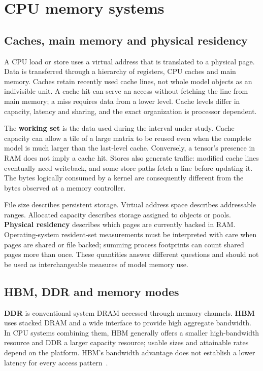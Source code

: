 \section{CPU memory systems}
\label{sec:cpu-memory-systems}

\subsection{Caches, main memory and physical residency}

A CPU load or store uses a virtual address that is translated to a
physical page.  Data is transferred through a hierarchy of registers,
CPU caches and main memory.  Caches retain recently used cache lines,
not whole model objects as an indivisible unit.  A cache hit can serve
an access without fetching the line from main memory; a miss requires
data from a lower level.  Cache levels differ in capacity, latency and
sharing, and the exact organization is processor dependent.

The \textbf{working set} is the data used during the interval under
study.  Cache capacity can allow a tile of a large matrix to be reused
even when the complete model is much larger than the last-level cache.
Conversely, a tensor's presence in RAM does not imply a cache hit.
Stores also generate traffic: modified cache lines eventually need
writeback, and some store paths fetch a line before updating it.  The
bytes logically consumed by a kernel are consequently different from
the bytes observed at a memory controller.

File size describes persistent storage.  Virtual address space describes
addressable ranges.  Allocated capacity describes storage assigned to
objects or pools.  \textbf{Physical residency} describes which pages are
currently backed in RAM.  Operating-system resident-set measurements
must be interpreted with care when pages are shared or file backed;
summing process footprints can count shared pages more than once.
These quantities answer different questions and should not be used as
interchangeable measures of model memory use.

\subsection{HBM, DDR and memory modes}

\textbf{DDR} is conventional system DRAM accessed through memory
channels.  \textbf{HBM} uses stacked DRAM and a wide interface to provide
high aggregate bandwidth.  In CPU systems combining them, HBM generally
offers a smaller high-bandwidth resource and DDR a larger capacity
resource; usable sizes and attainable rates depend on the platform.
HBM's bandwidth advantage does not establish a lower latency for every
access pattern~\cite{intelmaxoverview,ibeid2025aurora}.

